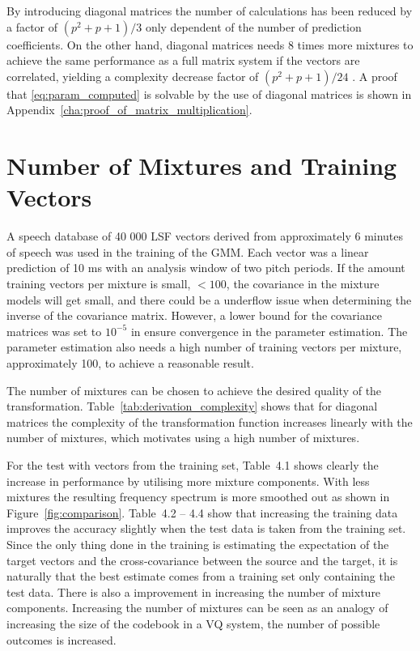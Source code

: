 By introducing diagonal matrices the number of calculations has been reduced by a factor of $(p^2+p+1)/3$ only dependent of the number of prediction coefficients. On the other hand, diagonal matrices needs 8 times more mixtures to achieve the same performance as a full matrix system if the vectors are correlated, yielding a complexity decrease factor of $(p^2+p+1)/24$ \cite{stylianou98}. A proof that \eqref{eq:param_computed} is solvable by the use of diagonal matrices is shown in Appendix~\ref{cha:proof_of_matrix_multiplication}. 


\section{Number of Mixtures and Training Vectors} %
\label{sec:number_of_mixture}
A speech database of 40 000 LSF vectors derived from approximately 6 minutes of speech was used in the training of the GMM. Each vector was a linear prediction of 10 ms with an analysis window of two pitch periods. If the amount training vectors per mixture is small, \eg $<100$, the covariance in the mixture models will get small, and there could be a underflow issue when determining the inverse of the covariance matrix. However, a lower bound for the covariance matrices was set to $10^{-5}$ in ensure convergence in the parameter estimation. The parameter estimation also needs a high number of training vectors per mixture, approximately 100, to achieve a reasonable result.

The number of mixtures can be chosen to achieve the desired quality of the transformation. Table~\ref{tab:derivation_complexity} shows that for diagonal matrices the complexity of the transformation function increases linearly with the number of mixtures, which motivates using a high number of mixtures.

For the test with vectors from the training set, Table~4.1 shows clearly the increase in performance by utilising more mixture components. With less mixtures the resulting frequency spectrum is more smoothed out as shown in Figure~\ref{fig:comparison}. Table~4.2 -- 4.4 show that increasing the training data improves the accuracy slightly when the test data is taken from the training set. Since the only thing done in the training is estimating the expectation of the target vectors and the cross-covariance between the source and the target, it is naturally that the best estimate comes from a training set only containing the test data. There is also a improvement in increasing the number of mixture components. Increasing the number of mixtures can be seen as an analogy of increasing the size of the codebook in a VQ system, the number of possible outcomes is increased. 

